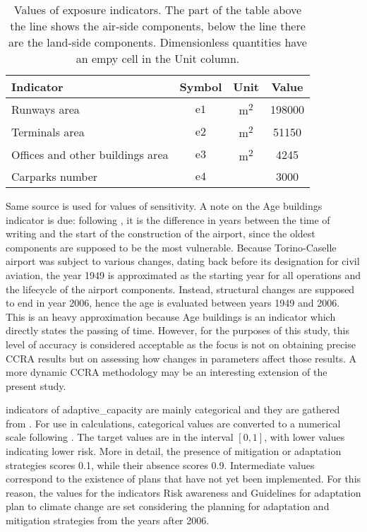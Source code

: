 \begin{table}
  \renewcommand*{\arraystretch}{1.5}
  \centering
  \caption{Values of exposure indicators. The part of the table above the line shows the air-side components, below the line there are the land-side components. Dimensionless quantities have an empy cell in the Unit column.}
  \label{tab:values_exposure}
  \begin{tabular}{p{}ccc}
    Indicator                        & Symbol        & Unit                 & Value  \\
    \hline
    Runways area                     & $\mathrm{e1}$ & \unit{\square\metre} & 198000 \\
    \hline
    Terminals area                   & $\mathrm{e2}$ & \unit{\square\metre} & 51150  \\
    Offices and other buildings area & $\mathrm{e3}$ & \unit{\square\metre} & 4245   \\
    Carparks number                  & $\mathrm{e4}$ &                      & 3000   \\
  \end{tabular}
\end{table}

Same source is used for values of \gls{sensitivity}. A note on the {Age buildings} indicator is due: following \cite[5]{2022DeVivoRiskAssessment}, it is the difference in years between the time of writing and the start of the construction of the airport, since the oldest components are supposed to be the most vulnerable. Because Torino-Caselle airport was subject to various changes, dating back before its designation for civil aviation, the year 1949 is approximated as the starting year for all operations and the lifecycle of the airport components. Instead, structural changes are supposed to end in year 2006, hence the age is evaluated between years 1949 and 2006. This is an heavy approximation because {Age buildings} is an indicator which directly states the passing of time. However, for the purposes of this study, this level of accuracy is considered acceptable as the focus is not on obtaining precise \gls{CCRA} results but on assessing how changes in parameters affect those results.
A more dynamic \gls{CCRA} methodology may be an interesting extension of the present study.

\Glspl{indicator} of \gls{adaptive_capacity} are mainly categorical and they are gathered from \cite[66-79]{2015PudduCorporateSocial}. For use in calculations, categorical values are converted to a numerical scale following \cite[6]{2023DeVivoClimate-RiskAssessment}. The target values are in the interval $[0, 1]$, with lower values indicating lower \gls{risk}. More in detail, the presence of mitigation or adaptation strategies scores \num{0.1}, while their absence scores \num{0.9}. Intermediate values correspond to the existence of plans that have not yet been implemented. For this reason, the values for the indicators {Risk awareness} and {Guidelines for adaptation plan to climate change} are set considering the planning for adaptation and mitigation strategies from the years after 2006.

